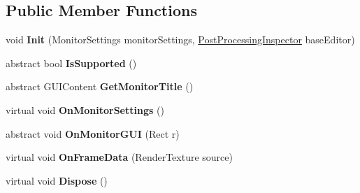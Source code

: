 \subsection*{Public Member Functions}
\begin{DoxyCompactItemize}
\item 
\mbox{\label{class_unity_editor_1_1_post_processing_1_1_post_processing_monitor_a7772670b4fd34e76a0cb35d372ed1718}} 
void {\bfseries Init} (Monitor\+Settings monitor\+Settings, \hyperlink{class_unity_editor_1_1_post_processing_1_1_post_processing_inspector}{Post\+Processing\+Inspector} base\+Editor)
\item 
\mbox{\label{class_unity_editor_1_1_post_processing_1_1_post_processing_monitor_ab308a1c99994f4708f5502ddc640dc0a}} 
abstract bool {\bfseries Is\+Supported} ()
\item 
\mbox{\label{class_unity_editor_1_1_post_processing_1_1_post_processing_monitor_a4fb67dcd17b84d422c69f98159e20545}} 
abstract G\+U\+I\+Content {\bfseries Get\+Monitor\+Title} ()
\item 
\mbox{\label{class_unity_editor_1_1_post_processing_1_1_post_processing_monitor_a40e1d68334826b54634a87837cc4ef89}} 
virtual void {\bfseries On\+Monitor\+Settings} ()
\item 
\mbox{\label{class_unity_editor_1_1_post_processing_1_1_post_processing_monitor_a51ecfadbfa10eb105e8c708b4d7064c4}} 
abstract void {\bfseries On\+Monitor\+G\+UI} (Rect r)
\item 
\mbox{\label{class_unity_editor_1_1_post_processing_1_1_post_processing_monitor_a490e202a0b1d45fdbc073d6000a7e220}} 
virtual void {\bfseries On\+Frame\+Data} (Render\+Texture source)
\item 
\mbox{\label{class_unity_editor_1_1_post_processing_1_1_post_processing_monitor_a89c45fe9fe5a185eb55ef522cba5dec5}} 
virtual void {\bfseries Dispose} ()
\end{DoxyCompactItemize}
